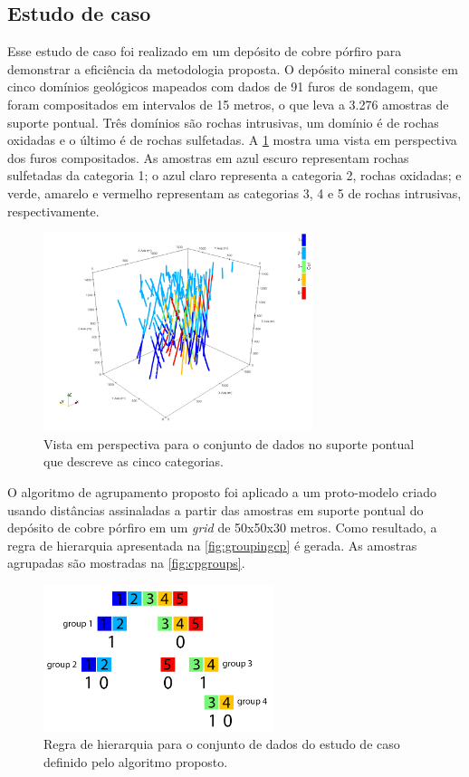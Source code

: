 \subsection{Estudo de caso}

Esse estudo de caso foi realizado em um depósito de cobre pórfiro para demonstrar a eficiência da metodologia proposta. O depósito mineral consiste em cinco domínios geológicos mapeados com dados de 91 furos de sondagem, que foram compositados em intervalos de 15 metros, o que leva a 3.276 amostras de suporte pontual. Três domínios são rochas intrusivas, um domínio é de rochas oxidadas e o último é de rochas sulfetadas. A \ref{fig:pointscp} mostra uma vista em perspectiva dos furos compositados. As amostras em azul escuro representam rochas sulfetadas da categoria 1; o azul claro representa a categoria 2, rochas oxidadas; e verde, amarelo e vermelho representam as categorias 3, 4 e 5 de rochas intrusivas, respectivamente.

\begin{figure}[H]
\caption{Vista em perspectiva para o conjunto de dados no suporte pontual que descreve as cinco categorias.}
\label{fig:pointscp}
\centering
\includegraphics[width=0.7\textwidth]{capitulo_3/imagens/pointscp.png}
\end{figure}

O algoritmo de agrupamento proposto foi aplicado a um proto-modelo criado usando distâncias assinaladas a partir das amostras em suporte pontual do depósito de cobre pórfiro em um \textit{grid} de 50x50x30 metros. Como resultado, a regra de hierarquia apresentada na \autoref{fig:groupingcp} é gerada. As amostras agrupadas são mostradas na \autoref{fig:cpgroups}.

\begin{figure}[H]
\caption{Regra de hierarquia para o conjunto de dados do estudo de caso definido pelo algoritmo proposto.}
\label{fig:groupingcp}
\centering
\includegraphics[width=0.6\textwidth]{capitulo_3/imagens/groupingcp.png}
\end{figure}

